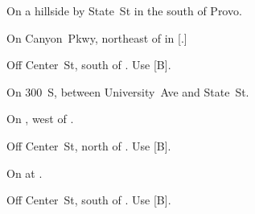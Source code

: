 
\begin{LocationList}

On a hillside by  State~St in the south of Provo.

On  Canyon~Pkwy, northeast of   in [.]

Off Center~St, south of . Use  [B].

On  300~S, between University~Ave and State~St.

On , west of  .

Off Center~St, north of . Use  [B].

\Location{\TruckStop \Gas \Rest}
On  at .

Off Center~St, south of . Use  [B].

\end{LocationList}
